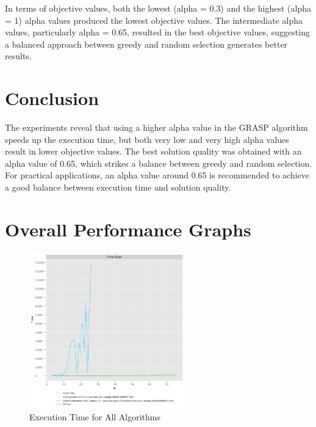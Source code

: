 \documentclass{article}
\begin{document}
In terms of objective values, both the lowest (alpha = 0.3) and the highest (alpha = 1) alpha values produced the lowest objective values. The intermediate alpha values, particularly alpha = 0.65, resulted in the best objective values, suggesting a balanced approach between greedy and random selection generates better results.

\section*{Conclusion}
The experiments reveal that using a higher alpha value in the GRASP algorithm speeds up the execution time, but both very low and very high alpha values result in lower objective values. The best solution quality was obtained with an alpha value of 0.65, which strikes a balance between greedy and random selection. For practical applications, an alpha value around 0.65 is recommended to achieve a good balance between execution time and solution quality.

\section{Overall Performance Graphs}

\begin{figure}[!h]
    \centering
    \includegraphics[width=0.6\textwidth]{./documentation/assets/new.all.timeChart.pdf}
    \caption{Execution Time for All Algorithms}
    \label{fig:all_time}
\end{figure}\FloatBarrier
\end{document}
